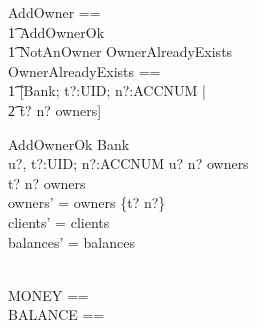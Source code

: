 \documentclass{article}
\begin{document}
\begin{zed}
AddOwner == \\
  \t1 AddOwnerOk \lor \\
  \t1 NotAnOwner \lor OwnerAlreadyExists \\
OwnerAlreadyExists == \\
  \t1 [\Xi Bank; t?:UID; n?:ACCNUM | \\
    \t2 t? \mapsto n? \in owners] \also
\end{zed}

\begin{schema}{AddOwnerOk}
\Delta Bank \\
u?, t?:UID; 
n?:ACCNUM
\where
u? \mapsto n? \in owners \\
t? \mapsto n? \notin owners \\
owners' = owners \cup \{t? \mapsto n?\} \\
clients' = clients \\
balances' = balances
\end{schema}


\begin{zed}
 \\
MONEY == \nat \\
BALANCE == \nat
\end{zed}
\end{document}
